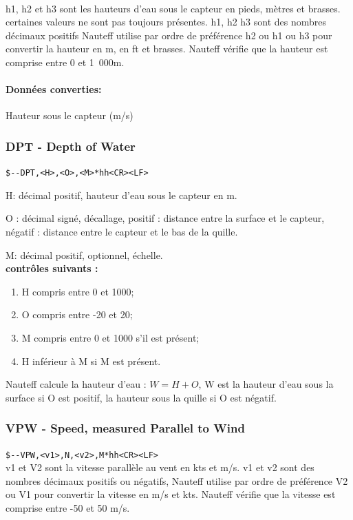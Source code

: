 \documentclass[a4paper,11pt]{report}
\begin{document}
\paragraph{}
h1, h2 et h3 sont les hauteurs d'eau sous le capteur en pieds, mètres et brasses.
certaines valeurs ne sont pas toujours présentes.
h1, h2 h3 sont des nombres décimaux positifs
Nauteff utilise par ordre de préférence h2 ou h1 ou h3
pour convertir la hauteur en m, en ft et brasses.
Nauteff vérifie que la hauteur est comprise entre 0 et 1~000m.

\paragraph{Données converties: } Hauteur sous le capteur (m/s)

\subsubsection{DPT - Depth of Water}
\texttt{\${-}{-}DPT,<H>,<O>,<M>*hh<CR><LF>}

H: décimal positif, hauteur d'eau sous le capteur en m.

O  : décimal signé,  décallage, positif : distance entre la surface et le capteur, négatif : distance entre le capteur et le bas de la quille.

M: décimal positif, optionnel, échelle.
\\
\textbf{ contrôles suivants :}
\begin{enumerate}
	\item H compris entre 0 et 1000;
	\item O compris entre -20 et 20;
	\item M compris entre 0 et 1000 s'il est présent;
	\item H inférieur à M si M est présent.
\end{enumerate}
Nauteff calcule la hauteur d'eau : \(W = H + O\), W est la hauteur d'eau sous la surface si O est positif, la hauteur sous la quille si O est négatif.


\subsubsection{VPW - Speed, measured Parallel to Wind}
\texttt{\${-}{-}VPW,<v1>,N,<v2>,M*hh<CR><LF>}
\\
v1 et V2 sont la vitesse parallèle au vent en kts et m/s.
v1 et v2 sont des nombres décimaux positifs ou négatifs,
Nauteff utilise par ordre de préférence V2 ou V1
pour convertir la vitesse en m/s et kts.
Nauteff vérifie que la vitesse est comprise entre -50 et 50 m/s.
\end{document}
